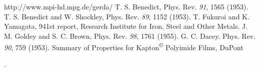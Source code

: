 \documentclass[a4paper,11pt]{article}
\begin{document}
\begin{thebibliography}{9} 
	 http://www.mpi-hd.mpg.de/gerda/
	 T. S. Benedict, Phys. Rev. \emph{91}, 1565 (1953).
	 T. S. Benedict and W. Shockley, Phys. Rev. \emph{89}, 1152 (1953).	
	 T. Fukuroi and K. Yamagata, 941st report, Research Institute for Iron, Steel and Other Metals.
	 J. M. Goldey and S. C. Brown, Phys. Rev. \emph{98}, 1761 (1955).
	 G. C. Dacey. Phys. Rev. \emph{90}, 759 (1953).
	 Summary of Properties for Kapton\textsuperscript{\copyright} Polyimide Films, DuPont{\begin{tiny}\texttrademark	                                                                                                                         \end{tiny}}.
\end{thebibliography}
\end{document}
